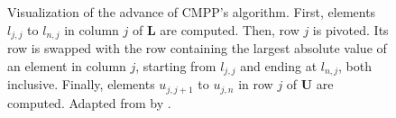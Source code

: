 \begin{figure}[ht!]
	\caption{Visualization of the advance of CMPP's algorithm.
		First, elements $l_{j,j}$ to $l_{n,j}$ in column $j$ of $\mathbf{L}$ are computed.
		Then, row $j$ is pivoted.
		Its row is swapped with the row containing the largest absolute value of an element in column $j$, starting from $l_{j,j}$ and ending at $l_{n,j}$, both inclusive.
		Finally, elements $u_{j,j+1}$ to $u_{j,n}$ in row $j$ of $\mathbf{U}$ are computed.
		Adapted from  by  \cite{rqjYYJkSwERYYbSy}.
	}
	\label{Figure:theory->ICMPP->LUP->CMPP->algorithm-advance-visualisation}
\end{figure}

